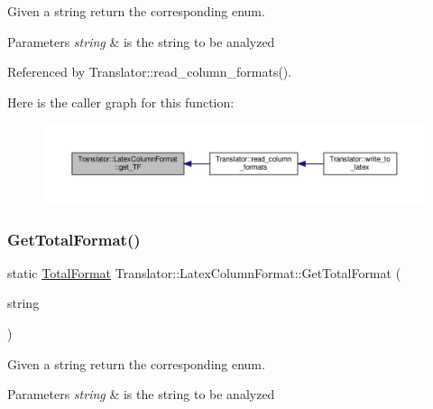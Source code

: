 Given a string return the corresponding enum. 


\begin{DoxyParams}{Parameters}
{\em string} & is the string to be analyzed \\
\hline
\end{DoxyParams}


Referenced by Translator\+::read\+\_\+column\+\_\+formats().

Here is the caller graph for this function\+:
\nopagebreak
\begin{figure}[H]
\begin{center}
\leavevmode
\includegraphics[width=350pt]{d0/d3c/classTranslator_1_1LatexColumnFormat_a79cff52c30fc3086aedcff72a10c484a_icgraph}
\end{center}
\end{figure}
\mbox{\label{classTranslator_1_1LatexColumnFormat_a278f02e75127b9616f1c1ce3f7c1ec50}} 
\subsubsection{\texorpdfstring{Get\+Total\+Format()}{GetTotalFormat()}}
{\footnotesize\ttfamily static \hyperlink{classTranslator_1_1LatexColumnFormat_a0754fb96fce28c9f04a8ef5353eede60}{Total\+Format} Translator\+::\+Latex\+Column\+Format\+::\+Get\+Total\+Format (\begin{DoxyParamCaption}\item[{const std\+::string \&}]{string }\end{DoxyParamCaption})\hspace{0.3cm}{\ttfamily [static]}}



Given a string return the corresponding enum. 


\begin{DoxyParams}{Parameters}
{\em string} & is the string to be analyzed \\
\hline
\end{DoxyParams}


